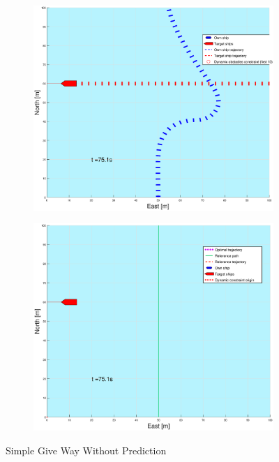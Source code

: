\begin{figure}[ht]
\begin{subfigure}[b]{0.499\textwidth}
    \end{subfigure}
    \hfill
    \\
    \begin{subfigure}[b]{0.49\textwidth}
        \centering
        \includegraphics[width=\textwidth]{Images/Figures/enkel_GW/_Simple_1fig1_time=75}
    \end{subfigure}
    \hfill
    \begin{subfigure}[b]{0.499\textwidth}
        \centering
        \includegraphics[width=\textwidth]{Images/Figures/enkel_GW/_Simple_1fig999_time=75}
    \end{subfigure}
    \hfill
    \caption{Simple Give Way Without Prediction}
\end{figure}



